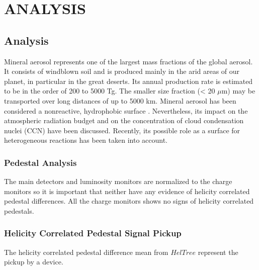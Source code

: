 \chapter{ANALYSIS}
\label{ANALYSIS}

\section{Analysis}
\label{Analysis}
Mineral aerosol represents one of the largest mass fractions of the global aerosol. It consists of windblown soil and is produced mainly in the arid areas of our planet, in particular in the great deserts. Its annual production rate is estimated to be in the order of 200 to 5000 Tg. The smaller size fraction (< 20 $\mu$m) may be transported over long distances  of up to 5000 km. Mineral aerosol has been considered a nonreactive, hydrophobic surface . Nevertheless, its impact on the atmospheric radiation budget and on the concentration of cloud condensation nuclei (CCN) have been discussed. Recently, its possible role as a surface for heterogeneous reactions has been taken into account.

\subsection{Pedestal Analysis}
\label{Pedestal Analysis}

The main detectors and luminosity monitors are normalized to the charge monitors so it is important that neither have any evidence of helicity correlated pedestal differences. All the charge monitors shows no signs of helicity correlated pedestals.

\subsection{Helicity Correlated Pedestal Signal Pickup}
\label{Helicity Correlated Pedestal Signal Pickup}
The helicity correlated pedestal difference mean from $HelTree$ represent the pickup by a device.

